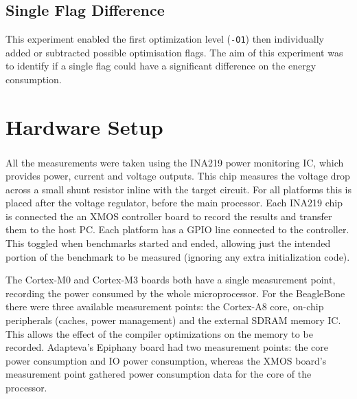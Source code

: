 \documentclass[twocolumn]{article}
\let\oldcite\cite
\renewcommand{\cite}[1]{\textsuperscript{\oldcite{#1}}}
\begin{document}
\subsection*{Single Flag Difference}

This experiment enabled the first optimization level (\texttt{-O1}) then individually added or subtracted possible optimisation flags. The aim of this experiment was to identify if a single flag could have a significant difference on the energy consumption.





\section*{Hardware Setup}

All the measurements were taken using the INA219 power monitoring IC\cite{INA219}, which provides power, current and voltage outputs. This chip measures the voltage drop across a small shunt resistor inline with the target circuit. For all platforms this is placed after the voltage regulator, before the main processor. Each INA219 chip is connected the an XMOS controller board to record the results and transfer them to the host PC. Each platform has a GPIO line connected to the controller. This toggled when benchmarks started and ended, allowing just the intended portion of the benchmark to be measured (ignoring any extra initialization code).

The Cortex-M0 and Cortex-M3 boards both have a single measurement point, recording the power consumed by the whole microprocessor. For the BeagleBone there were three available measurement points: the Cortex-A8 core, on-chip peripherals (caches, power management) and the external SDRAM memory IC. This allows the effect of the compiler optimizations on the memory to be recorded. Adapteva's Epiphany board had two measurement points: the core power consumption and IO power consumption, whereas the XMOS board's measurement point gathered power consumption data for the core of the processor.
\end{document}
